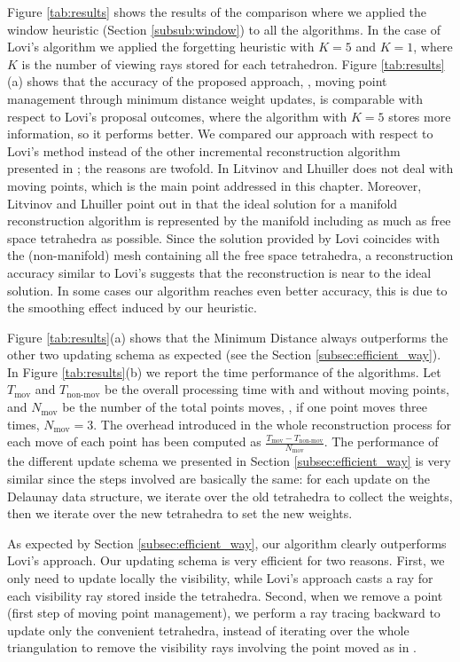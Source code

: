 Figure \ref{tab:results} shows the results of the comparison where we applied the window heuristic (Section \ref{subsub:window}) to all the algorithms. In the case of Lovi's algorithm we applied the forgetting heuristic with $K=5$ and $K=1$, where $K$ is the number of viewing rays stored for each tetrahedron.
Figure  \ref{tab:results}(a) shows that the accuracy of the proposed approach, \ie, moving point management through minimum distance weight updates, is comparable with respect to Lovi's proposal outcomes, where the algorithm with $K=5$ stores more information, so it performs better.
We compared our approach with respect to Lovi's method instead of the other incremental reconstruction algorithm presented in \cite{litvinov_lhuillier_13}; the reasons are twofold. 
In \cite{litvinov_lhuillier_13} Litvinov and Lhuiller does not deal with moving points, which is the main point addressed in this chapter. Moreover, Litvinov and Lhuiller point out in \cite{litvinov_Lhiuller14} that the ideal solution for a manifold reconstruction algorithm is represented by the manifold including as much as free space tetrahedra as possible. Since the solution provided by Lovi \etal coincides with the (non-manifold) mesh containing all the free space tetrahedra, a reconstruction accuracy similar to Lovi's suggests that the reconstruction is near to the ideal solution. In some cases our algorithm reaches even better accuracy, this is due to the smoothing effect induced by our heuristic.


Figure \ref{tab:results}(a) shows that the Minimum Distance always outperforms the other two updating schema as expected (see the Section \ref{subsec:efficient_way}).
In Figure \ref{tab:results}(b) we report the time performance of the algorithms.
Let $T_{\text{mov}}$ and $T_{\text{non-mov}}$ be the overall processing time with and without moving points, and $N_{\text{mov}}$ be the number of the total points moves, \eg, if one point moves three times, $N_{\text{mov}}=3$.
The overhead introduced in the whole reconstruction process for each move of each point has been computed as $\frac{T_{\text{mov}} - T_{\text{non-mov}}}{N_{\text{mov}}}$.
The performance of the different update schema we presented in Section \ref{subsec:efficient_way} is very similar since the steps involved are basically the same: for each update on the Delaunay data structure, we iterate over the old tetrahedra to collect the weights, then we iterate over the new tetrahedra to set the new weights.

As expected by Section \ref{subsec:efficient_way}, our algorithm clearly outperforms Lovi's approach. Our updating schema is very efficient for two reasons. 
First, we only need to update locally the visibility, while Lovi's approach casts a ray for each visibility ray stored inside the tetrahedra.
Second, when we remove a point (first step of moving point management), we perform a ray tracing backward to update only the convenient tetrahedra,  instead of iterating over the whole triangulation to remove the visibility rays involving the point moved as in \cite{lovi_et_al_11}.
  
